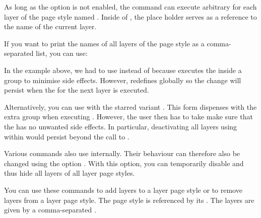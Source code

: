 \begin{Declaration}
\end{Declaration}
%
%
As long as the \KOMAScript{} option  is not
enabled, the  command can execute arbitrary
 for each layer of the page style named .
Inside of , the place holder  serves as a
reference to the name of the current layer.
\begin{Example}
  If you want to print the names of all layers of the 
  page style as a comma-separated list, you can use:
\begin{lstcode}
  \let\commaatlist\empty
  \ForEachLayerOfPageStyle{scrheadings}{%
    \commaatlist#1\gdef\commaatlist{, }}
\end{lstcode}
\end{Example}
In the example above, we had to use  instead
of  because  executes the 
 inside a group to minimise side effects. However, 
redefines  globally so the change will persist when the
 for the next layer is executed.

Alternatively, you can use 
with the starred variant . This form dispenses
with the extra group when executing . However, the user then has
to take make sure that the  has no unwanted side effects. In
particular, deactivating all layers using
 within  would
persist beyond the call to .

Various  commands also use 
internally. Their behaviour can therefore also be changed using the
\KOMAScript{} option . With this option,
you can temporarily disable and thus hide all layers of all layer page
styles.%
\EndIndexGroup


\begin{Declaration}
\end{Declaration}
%
%
You can use these commands to add layers to a layer page style or to remove
layers from a layer page style. The page style is referenced by its
. The layers are given by a comma-separated
.


